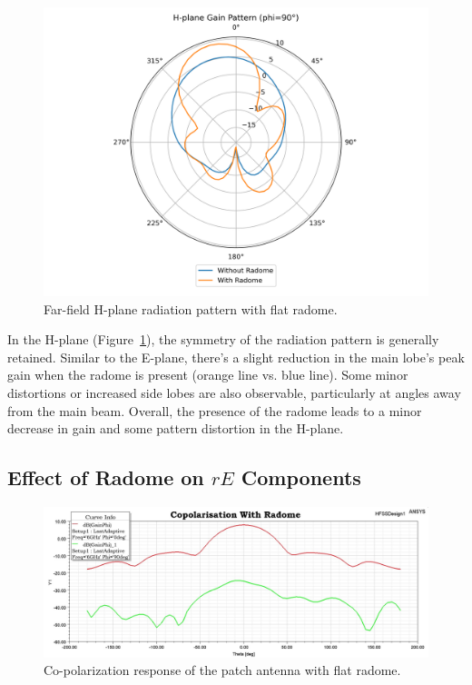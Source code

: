 \begin{figure}[H]
\centering
\includegraphics[width=1.0\textwidth]{figures/comparison_flat_radome/gain_H_polar.png}
\caption{Far-field H-plane radiation pattern with flat radome.}
\label{fig:res-flat-hplane}
\end{figure}

In the H-plane (Figure~\ref{fig:res-flat-hplane}), the symmetry of the radiation pattern is generally retained. Similar to the E-plane, there's a slight reduction in the main lobe's peak gain when the radome is present (orange line vs. blue line). Some minor distortions or increased side lobes are also observable, particularly at angles away from the main beam. Overall, the presence of the radome leads to a minor decrease in gain and some pattern distortion in the H-plane.

\subsection{Effect of Radome on \texorpdfstring{$rE$}{rE} Components}

\begin{figure}[H]
    \centering
    \includegraphics[width=1.0\textwidth]{figures/with_radome/Co.jpeg}
    \caption{Co-polarization response of the patch antenna with flat radome.}
    \label{fig:res-co-radome}
\end{figure}

